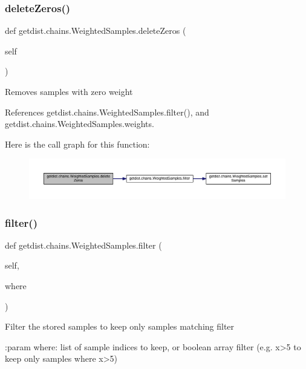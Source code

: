\subsubsection{\texorpdfstring{delete\+Zeros()}{deleteZeros()}}
{\footnotesize\ttfamily def getdist.\+chains.\+Weighted\+Samples.\+delete\+Zeros (\begin{DoxyParamCaption}\item[{}]{self }\end{DoxyParamCaption})}

\begin{DoxyVerb}Removes samples with zero weight\end{DoxyVerb}
 

References getdist.\+chains.\+Weighted\+Samples.\+filter(), and getdist.\+chains.\+Weighted\+Samples.\+weights.

Here is the call graph for this function\+:
\nopagebreak
\begin{figure}[H]
\begin{center}
\leavevmode
\includegraphics[width=350pt]{classgetdist_1_1chains_1_1WeightedSamples_af496bff9dd6b71eaf5618760aa442f50_cgraph}
\end{center}
\end{figure}
\mbox{\label{classgetdist_1_1chains_1_1WeightedSamples_a2b75dc00ef960c6d4769476c6125d50f}} 
\subsubsection{\texorpdfstring{filter()}{filter()}}
{\footnotesize\ttfamily def getdist.\+chains.\+Weighted\+Samples.\+filter (\begin{DoxyParamCaption}\item[{}]{self,  }\item[{}]{where }\end{DoxyParamCaption})}

\begin{DoxyVerb}Filter the stored samples to keep only samples matching filter

:param where: list of sample indices to keep, or boolean array filter (e.g. x>5 to keep only samples where x>5)
\end{DoxyVerb}
 

